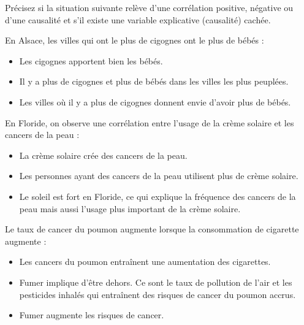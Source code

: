 \documentclass[10pt, a4paper]{article}
\begin{document}
\begin{tcolorbox}[lefttitle=2cm, colframe=gray!75!black, colback=white, title=\textbf{EXERCICE 2 : Subtilités statistiques. Causalité et corrélation.}]
Précisez si la situation suivante relève d'une corrélation positive, négative ou d'une causalité et s'il existe une variable explicative (causalité) cachée.



    En Alsace, les villes qui ont le plus de cigognes ont le plus de bébés :
        \begin{itemize}
            \item Les cigognes apportent bien les bébés.
            \item Il y a plus de cigognes et plus de bébés dans les villes les plus peuplées.
            \item Les villes où il y a plus de cigognes donnent envie d'avoir plus de bébés.
        \end{itemize}

        
    En Floride, on observe une corrélation entre l'usage de la crème solaire et les cancers de la peau :
    
        \begin{itemize}
            \item La crème solaire crée des cancers de la peau.
            \item Les personnes ayant des cancers de la peau utilisent plus de crème solaire.
            \item Le soleil est fort en Floride, ce qui explique la fréquence des cancers de la peau mais aussi l'usage plus important de la crème solaire.
        \end{itemize}

    Le taux de cancer du poumon augmente lorsque la consommation de cigarette augmente :

        \begin{itemize}
            \item Les cancers du poumon entraînent une aumentation des cigarettes.
            \item Fumer implique d'être dehors. Ce sont le taux de pollution de l'air et les pesticides inhalés qui entraînent des risques de cancer du poumon accrus.
            \item Fumer augmente les risques de cancer.
        \end{itemize}

\end{tcolorbox}
\end{document}
